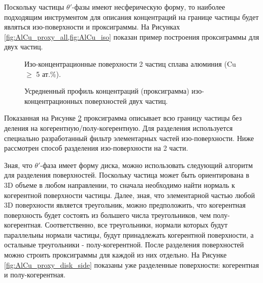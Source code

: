 Поскольку частицы $\theta '$-фазы имеют несферическую форму, то наиболее подходящим инструментом для описания концентраций на границе частицы будет являться изо-поверхности и проксиграммы. На Рисунках \cref{fig:AlCu_proxy_all,fig:AlCu_iso} показан пример построения проксиграммы для двух частиц.

\begin{figure}[htb]
	\caption{Изо-концентрационные поверхности 2 частиц сплава алюминия (Cu $\geq$ 5 ат.\%).}
	\label{fig:AlCu_iso}
\end{figure}


\begin{figure}[htb]
	\caption{Усредненный профиль концентраций (проксиграмма) изо-концентрационных поверхностей двух частиц.}
	\label{fig:AlCu_proxy_all}
\end{figure}

\FloatBarrier

Показанная на Рисунке \cref{fig:AlCu_proxy_all} проксиграмма описывает всю границу частицы без деления на когерентную/полу-когерентную. Для разделения используется специально разработанный фильтр элементарных частей изо-поверхности. Ниже рассмотрен способ разделения изо-поверхности на 2 части. 

Зная, что $\theta '$-фаза имеет форму диска, можно использовать следующий алгоритм для разделения поверхностей. Поскольку частица может быть ориентирована в 3D объеме в любом направлении, то сначала необходимо найти нормаль к когерентной поверхности частицы. Далее, зная, что элементарной частью любой 3D поверхности является треугольник, можно предположить, что когерентная поверхность будет состоять из большего числа треугольников, чем полу-когерентная. Соответственно, все треугольники, нормали которых будут параллельны нормали частицы, будут принадлежать когерентной поверхности, а остальные треугольники - полу-когерентной. После разделения поверхностей можно строить проксиграммы для каждой из них отдельно. На Рисунке \cref{fig:AlCu_proxy_disk_side} показаны уже разделенные поверхности: когерентная и полу-когерентная.


